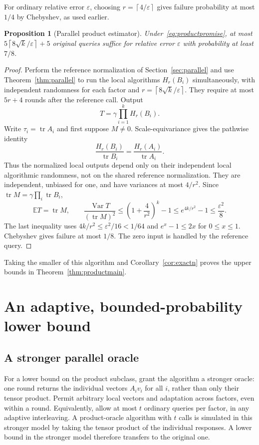 \documentclass[11pt]{article}
\newtheorem{proposition}[theorem]{Proposition}
\theoremstyle{definition}\newtheorem{definition}[theorem]{Definition}
\theoremstyle{remark}\newtheorem{remark}[theorem]{Remark}
\newcommand{\E}{\mathbb E}\newcommand{\PP}{\mathbb P}
\newcommand{\tr}{\operatorname{tr}}\newcommand{\rank}{\operatorname{rank}}
\newcommand{\Var}{\operatorname{Var}}\newcommand{\Cov}{\operatorname{Cov}}
\newcommand{\eps}{\varepsilon}\newcommand{\Qprod}{Q_{\mathrm{prod}}}
\newcommand{\ceil}[1]{\left\lceil#1\right\rceil}
\begin{document}
For ordinary relative error $\eps$, choosing $r=\ceil{4/\eps}$ gives failure
probability at most $1/4$ by Chebyshev, as used earlier.

\begin{proposition}[Parallel product estimator]\label{prop:productupper}
Under~\eqref{eq:productpromise}, at most
$5\ceil{8\sqrt k/\eps}+5$ original queries suffice for
relative error $\eps$ with probability at least $7/8$.
\end{proposition}
\begin{proof}
Perform the reference normalization of Section~\ref{sec:parallel} and use
Theorem~\ref{thm:parallel} to run the local algorithms $H_r(B_i)$ simultaneously,
with independent randomness for each factor and $r=\ceil{8\sqrt k/\eps}$.
They require at most $5r+4$ rounds after the reference call. Output
\[
 T=\gamma\prod_{i=1}^k H_r(B_i).
\]
Write $\tau_i=\tr A_i$ and first suppose $M\ne0$.
Scale-equivariance gives the pathwise identity
\[
 \frac{H_r(B_i)}{\tr B_i}
   =\frac{H_r(A_i)}{\tr A_i}.
\]
Thus the normalized local outputs depend only on their independent local
algorithmic randomness, not on the shared reference normalization. They are
independent, unbiased for one, and have variances at most $4/r^2$.
Since $\tr M=\gamma\prod_i\tr B_i$,
\[
 \E T=\tr M,\qquad
 \frac{\Var T}{(\tr M)^2}
 \le\left(1+\frac4{r^2}\right)^k-1
 \le e^{4k/r^2}-1
 \le\frac{\eps^2}{8}.
\]
The last inequality uses $4k/r^2\le\eps^2/16<1/64$ and
$e^x-1\le2x$ for $0\le x\le1$. Chebyshev gives failure at most $1/8$.
The zero input is handled by the reference query.
\end{proof}

Taking the smaller of this algorithm and Corollary~\ref{cor:exactn} proves the
upper bounds in Theorem~\ref{thm:productmain}.

\section{An adaptive, bounded-probability lower bound}
\label{sec:lower}

\subsection{A stronger parallel oracle}
For a lower bound on the product subclass, grant the algorithm a stronger oracle:
one round returns the individual vectors $A_i v_i$ for all $i$, rather than only
their tensor product. Permit arbitrary local vectors and adaptation across
factors, even within a round. Equivalently, allow at most $t$ ordinary queries
per factor, in any adaptive interleaving. A product-oracle algorithm with $t$
calls is simulated in this stronger model by taking the tensor product of the
individual responses. A lower bound in the stronger model therefore transfers
to the original one.
\end{document}

